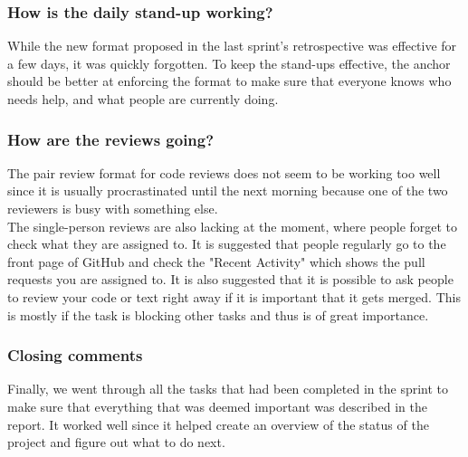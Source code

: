\subsubsection*{How is the daily stand-up working?}
While the new format proposed in the last sprint's retrospective was effective for a few days, it was quickly forgotten.
To keep the stand-ups effective, the anchor should be better at enforcing the format to make sure that everyone knows who needs help, and what people are currently doing.

\subsubsection*{How are the reviews going?}
The pair review format for code reviews does not seem to be working too well since it is usually procrastinated until the next morning because one of the two reviewers is busy with something else.
\\
The single-person reviews are also lacking at the moment, where people forget to check what they are assigned to.
It is suggested that people regularly go to the front page of GitHub and check the "Recent Activity" which shows the pull requests you are assigned to.
It is also suggested that it is possible to ask people to review your code or text right away if it is important that it gets merged.
This is mostly if the task is blocking other tasks and thus is of great importance.


\subsubsection*{Closing comments}
Finally, we went through all the tasks that had been completed in the sprint to make sure that everything that was deemed important was described in the report.
It worked well since it helped create an overview of the status of the project and figure out what to do next.
